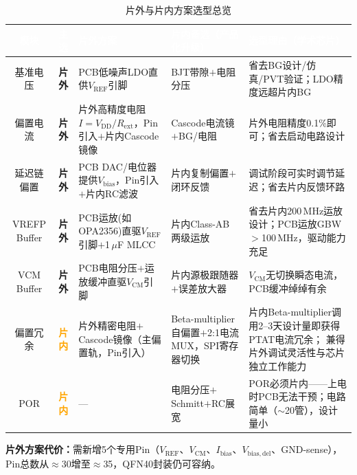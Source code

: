 \documentclass[12pt,a4paper,fontset=none]{ctexart}
\begin{document}
\begin{table}[H]
\centering
\caption{片外与片内方案选型总览}
\scriptsize
\begin{tabular}{@{}ccL{2.4cm}L{3.0cm}L{4.0cm}@{}}
\toprule
{}
\textcolor{white}{\textbf{模块}} &
\textcolor{white}{\textbf{主选}} &
\textcolor{white}{\textbf{片外方案}} &
\textcolor{white}{\textbf{片内备选（产品化升级）}} &
\textcolor{white}{\textbf{选型理由（学术芯片）}} \\
\midrule
基准电压 &
\textcolor{green!50!black}{\textbf{片外}} &
PCB低噪声LDO直供$V_{\mathrm{REF}}$引脚 &
BJT带隙$+$电阻分压 &
省去BG设计/仿真/PVT验证；LDO精度远超片内BG \\
\midrule
偏置电流 &
\textcolor{green!50!black}{\textbf{片外}} &
片外高精度电阻$I\!=\!V_{\mathrm{DD}}/R_{\mathrm{ext}}$，Pin引入$+$片内Cascode镜像 &
Cascode电流镜$+$BG/电阻 &
片外电阻精度0.1\%即可；省去启动电路设计 \\
\midrule
延迟链偏置 &
\textcolor{green!50!black}{\textbf{片外}} &
PCB DAC/电位器提供$V_{\mathrm{bias}}$，Pin引入$+$片内RC滤波 &
片内复制偏置$+$闭环反馈 &
调试阶段可实时调节延迟；省去片内反馈环路 \\
\midrule
VREFP Buffer &
\textcolor{green!50!black}{\textbf{片外}} &
PCB运放(如OPA2356)直驱$V_{\mathrm{REF}}$引脚$+$1\,$\mu$F MLCC &
片内Class-AB两级运放 &
省去片内200\,MHz运放设计；PCB运放GBW$>$100\,MHz，驱动能力充足 \\
\midrule
VCM Buffer &
\textcolor{green!50!black}{\textbf{片外}} &
PCB电阻分压$+$运放缓冲直驱$V_{\mathrm{CM}}$引脚 &
片内源极跟随器$+$误差放大器 &
$V_{\mathrm{CM}}$无切换瞬态电流，PCB缓冲绰绰有余 \\
\midrule
偏置冗余 &
\textcolor{orange}{\textbf{片内}} &
片外精密电阻$+$Cascode镜像（主偏置轨，Pin引入）&
Beta-multiplier自偏置$+$2:1电流MUX，SPI寄存器切换 &
片内Beta-multiplier调用2--3天设计量即获得PTAT电流冗余；\newline
兼得片外调试灵活性与芯片独立工作能力 \\
\midrule
POR &
\textcolor{orange}{\textbf{片内}} &
— &
电阻分压$+$Schmitt$+$RC展宽 &
POR必须片内——上电时PCB无法干预；电路简单（$\sim$20管），设计量小 \\
\bottomrule
\end{tabular}
\end{table}

\textbf{片外方案代价：}需新增5个专用Pin（$V_{\mathrm{REF}}$、$V_{\mathrm{CM}}$、$I_{\mathrm{bias}}$、$V_{\mathrm{bias,del}}$、GND-sense），
Pin总数从$\approx$30增至$\approx$35，QFN40封装仍可容纳。
\end{document}
